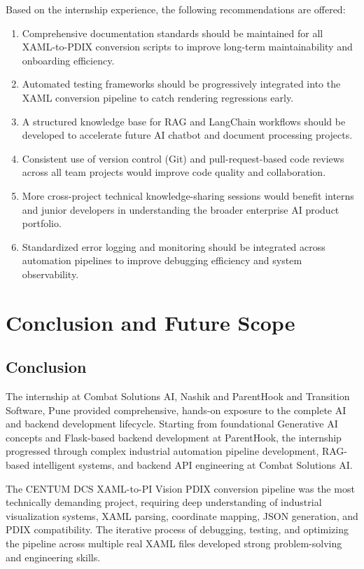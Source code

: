 \documentclass[12pt,a4paper]{report}
\begin{document}
Based on the internship experience, the following recommendations are offered:
\begin{enumerate}[leftmargin=1.5cm]
    \item Comprehensive documentation standards should be maintained for all XAML-to-PDIX conversion scripts to improve long-term maintainability and onboarding efficiency.
    \item Automated testing frameworks should be progressively integrated into the XAML conversion pipeline to catch rendering regressions early.
    \item A structured knowledge base for RAG and LangChain workflows should be developed to accelerate future AI chatbot and document processing projects.
    \item Consistent use of version control (Git) and pull-request-based code reviews across all team projects would improve code quality and collaboration.
    \item More cross-project technical knowledge-sharing sessions would benefit interns and junior developers in understanding the broader enterprise AI product portfolio.
    \item Standardized error logging and monitoring should be integrated across automation pipelines to improve debugging efficiency and system observability.
\end{enumerate}

\chapter{Conclusion and Future Scope}

\section{Conclusion}

The internship at Combat Solutions AI, Nashik and ParentHook and Transition Software, Pune provided comprehensive, hands-on exposure to the complete AI and backend development lifecycle. Starting from foundational Generative AI concepts and Flask-based backend development at ParentHook, the internship progressed through complex industrial automation pipeline development, RAG-based intelligent systems, and backend API engineering at Combat Solutions AI.

The CENTUM DCS XAML-to-PI Vision PDIX conversion pipeline was the most technically demanding project, requiring deep understanding of industrial visualization systems, XAML parsing, coordinate mapping, JSON generation, and PDIX compatibility. The iterative process of debugging, testing, and optimizing the pipeline across multiple real XAML files developed strong problem-solving and engineering skills.
\end{document}
